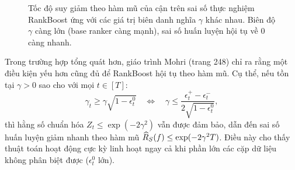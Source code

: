 \begin{figure}[H]
    \centering
    \caption{Tốc độ suy giảm theo hàm mũ của cận trên sai số thực nghiệm RankBoost ứng với các giá trị biên danh nghĩa $\gamma$ khác nhau. Biên độ $\gamma$ càng lớn (base ranker càng mạnh), sai số huấn luyện hội tụ về $0$ càng nhanh.}
    \label{fig:exponential_error_decay}
\end{figure}

\begin{tcolorbox}[enhanced, breakable, colback=blue!5, colframe=blue!50!black, title={\textbf{Cận hội tụ dưới điều kiện yếu hơn (Weaker Edge Condition)}}]
Trong trường hợp tổng quát hơn, giáo trình Mohri (trang 248) chỉ ra rằng một điều kiện yếu hơn cũng đủ để RankBoost hội tụ theo hàm mũ. Cụ thể, nếu tồn tại $\gamma > 0$ sao cho với mọi $t \in [T]$:
\begin{equation}
    \gamma_t \geq \gamma \sqrt{1 - \epsilon^0_t} \quad \Longleftrightarrow \quad \gamma \leq \frac{\epsilon^+_t - \epsilon^-_t}{2\sqrt{1 - \epsilon^0_t}},
    \label{eq:weaker_edge}
\end{equation}
thì hằng số chuẩn hóa $Z_t \leq \exp(-2\gamma^2)$ vẫn được đảm bảo, dẫn đến sai số huấn luyện giảm nhanh theo hàm mũ $\widehat{R}_S(f) \leq \exp(-2\gamma^2 T)$. Điều này cho thấy thuật toán hoạt động cực kỳ linh hoạt ngay cả khi phần lớn các cặp dữ liệu không phân biệt được ($\epsilon^0_t$ lớn).
\end{tcolorbox}

